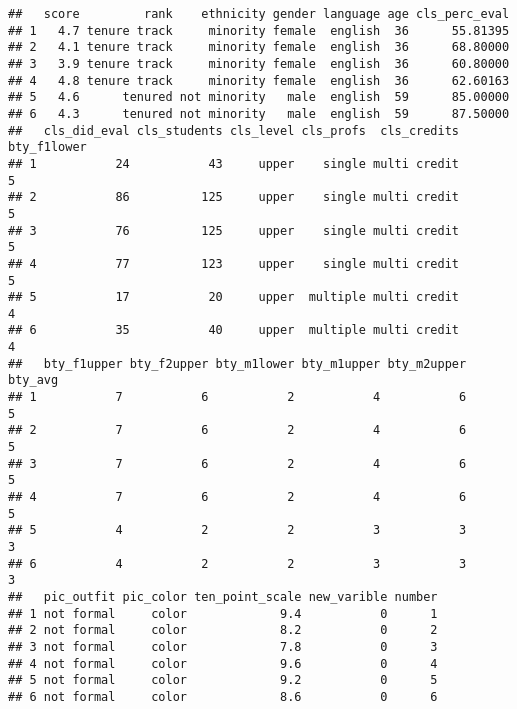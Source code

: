 \documentclass[
]{article}
\begin{document}
\begin{verbatim}
##   score         rank    ethnicity gender language age cls_perc_eval
## 1   4.7 tenure track     minority female  english  36      55.81395
## 2   4.1 tenure track     minority female  english  36      68.80000
## 3   3.9 tenure track     minority female  english  36      60.80000
## 4   4.8 tenure track     minority female  english  36      62.60163
## 5   4.6      tenured not minority   male  english  59      85.00000
## 6   4.3      tenured not minority   male  english  59      87.50000
##   cls_did_eval cls_students cls_level cls_profs  cls_credits bty_f1lower
## 1           24           43     upper    single multi credit           5
## 2           86          125     upper    single multi credit           5
## 3           76          125     upper    single multi credit           5
## 4           77          123     upper    single multi credit           5
## 5           17           20     upper  multiple multi credit           4
## 6           35           40     upper  multiple multi credit           4
##   bty_f1upper bty_f2upper bty_m1lower bty_m1upper bty_m2upper bty_avg
## 1           7           6           2           4           6       5
## 2           7           6           2           4           6       5
## 3           7           6           2           4           6       5
## 4           7           6           2           4           6       5
## 5           4           2           2           3           3       3
## 6           4           2           2           3           3       3
##   pic_outfit pic_color ten_point_scale new_varible number
## 1 not formal     color             9.4           0      1
## 2 not formal     color             8.2           0      2
## 3 not formal     color             7.8           0      3
## 4 not formal     color             9.6           0      4
## 5 not formal     color             9.2           0      5
## 6 not formal     color             8.6           0      6
\end{verbatim}
\end{document}
